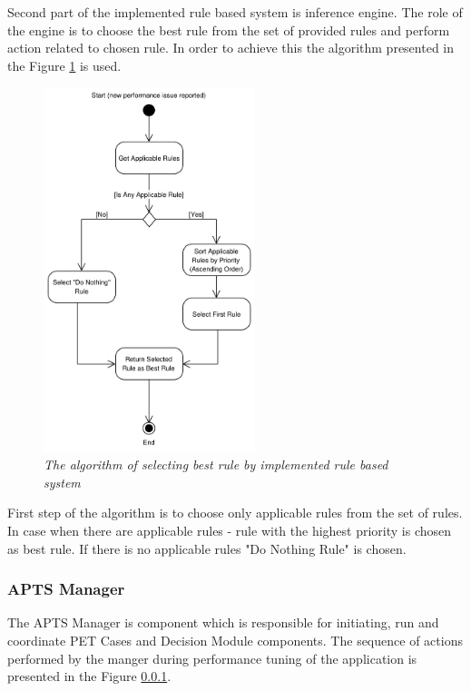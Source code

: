 \documentclass[10pt,a4paper]{article}
\begin{document}
\pagebreak


Second part of the implemented rule based system is inference engine. The role of the engine is to choose the best rule from the set of provided rules and perform action related to chosen rule. In order to achieve this the algorithm presented in the Figure \ref{dmalgorithm} is used. 

\begin{figure}[!htb]
\centering
\includegraphics[width=0.55\textwidth]{DecisionModuleActivityDiagram}
\caption{\textit{The algorithm of selecting best rule by implemented rule based system}} \label{dmalgorithm}
\end{figure}

First step of the algorithm is to choose only applicable rules from the set of rules. In case when there are applicable rules - rule with the highest priority is chosen as best rule. If there is no applicable rules "Do Nothing Rule" is chosen.

\subsubsection{APTS Manager} \label{manager}

The APTS Manager is component which is responsible for initiating, run and coordinate PET Cases and Decision Module components. The sequence of actions performed by the manger during performance tuning of the application is presented in the Figure \ref{manager}.
\end{document}
